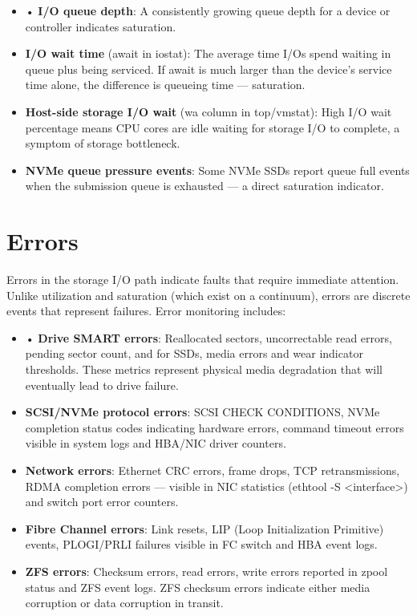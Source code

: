 \begin{itemize}
  \item • \textbf{I/O queue depth}: A consistently growing queue depth for a device or controller indicates saturation.
  \item \textbf{I/O wait time} (await in iostat): The average time I/Os spend waiting in queue plus being serviced. If await is much larger than the device's service time alone, the difference is queueing time --- saturation.
  \item \textbf{Host-side storage I/O wait} (wa column in top/vmstat): High I/O wait percentage means CPU cores are idle waiting for storage I/O to complete, a symptom of storage bottleneck.
  \item \textbf{NVMe queue pressure events}: Some NVMe SSDs report queue full events when the submission queue is exhausted --- a direct saturation indicator.
\end{itemize}

\section{Errors}
Errors in the storage I/O path indicate faults that require immediate attention. Unlike utilization and saturation (which exist on a continuum), errors are discrete events that represent failures. Error monitoring includes:

\begin{itemize}
  \item • \textbf{Drive SMART errors}: Reallocated sectors, uncorrectable read errors, pending sector count, and for SSDs, media errors and wear indicator thresholds. These metrics represent physical media degradation that will eventually lead to drive failure.
  \item \textbf{SCSI/NVMe protocol errors}: SCSI CHECK CONDITIONS, NVMe completion status codes indicating hardware errors, command timeout errors visible in system logs and HBA/NIC driver counters.
  \item \textbf{Network errors}: Ethernet CRC errors, frame drops, TCP retransmissions, RDMA completion errors --- visible in NIC statistics (ethtool -S \textless interface\textgreater) and switch port error counters.
  \item \textbf{Fibre Channel errors}: Link resets, LIP (Loop Initialization Primitive) events, PLOGI/PRLI failures visible in FC switch and HBA event logs.
  \item \textbf{ZFS errors}: Checksum errors, read errors, write errors reported in zpool status and ZFS event logs. ZFS checksum errors indicate either media corruption or data corruption in transit.
\end{itemize}


